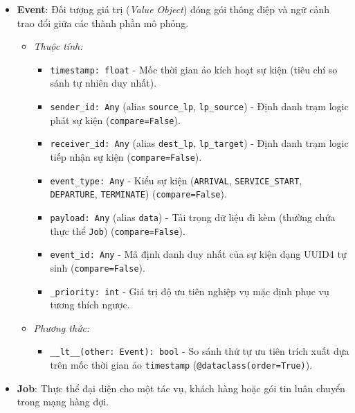 \begin{itemize}[leftmargin=1.5em, itemsep=8pt]
\item \textbf{Event}: Đối tượng giá trị (\textit{Value Object}) đóng gói thông điệp và ngữ cảnh trao đổi giữa các thành phần mô phỏng.

\begin{itemize}[leftmargin=1.2em, label={}, itemsep=3pt]
\item[\textendash] \textit{Thuộc tính:}
\begin{itemize}[leftmargin=1.5em, label=+, itemsep=2pt]
\item \texttt{timestamp: float} - Mốc thời gian ảo kích hoạt sự kiện (tiêu chí so sánh tự nhiên duy nhất).
\item \texttt{sender\_id: Any} (alias \texttt{source\_lp}, \texttt{lp\_source}) - Định danh trạm logic phát sự kiện (\texttt{compare=False}).
\item \texttt{receiver\_id: Any} (alias \texttt{dest\_lp}, \texttt{lp\_target}) - Định danh trạm logic tiếp nhận sự kiện (\texttt{compare=False}).
\item \texttt{event\_type: Any} - Kiểu sự kiện (\texttt{ARRIVAL}, \texttt{SERVICE\_START}, \texttt{DEPARTURE}, \texttt{TERMINATE}) (\texttt{compare=False}).
\item \texttt{payload: Any} (alias \texttt{data}) - Tải trọng dữ liệu đi kèm (thường chứa thực thể \texttt{Job}) (\texttt{compare=False}).
\item \texttt{event\_id: Any} - Mã định danh duy nhất của sự kiện dạng UUID4 tự sinh (\texttt{compare=False}).
\item \texttt{\_priority: int} - Giá trị độ ưu tiên nghiệp vụ mặc định phục vụ tương thích ngược.
\end{itemize}

\item[\textendash] \textit{Phương thức:}
\begin{itemize}[leftmargin=1.5em, label=+, itemsep=2pt]
\item \texttt{\_\_lt\_\_(other: Event): bool} - So sánh thứ tự ưu tiên trích xuất dựa trên mốc thời gian ảo \texttt{timestamp} (\texttt{@dataclass(order=True)}).
\end{itemize}
\end{itemize}

\item \textbf{Job}: Thực thể đại diện cho một tác vụ, khách hàng hoặc gói tin luân chuyển trong mạng hàng đợi.


\end{itemize}
